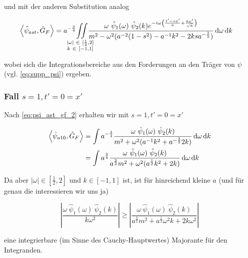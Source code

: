 
und mit der anderen Substitution analog

\begin{align}
    \left< \hat\psi_{ast}, \hat G_F \right>
    &=
    a^{-\frac{3}{4}}
    \kern -1em
    \iint \limits_{\substack{
        |\omega|~ \in~ [\frac{1}{2},2] \\
        k ~\in~ [-1,1]
        }
    }
    \kern -1em
    \frac{
        \omega ~\hat \psi_1(\omega) ~\hat \psi_2(k)
        e^{-i \omega \left(\frac{t' - sx'}{a} + \frac{kx'}{\sqrt{a}}\right)}
    }
    {
        m^2 - \omega^2(a^{-2}(1-s^2)-a^{-1}k^2 - 2 k s a^{-\frac{3}{2}})
    }
    \d \omega \d k
    \label{eq:psi_ast_gf_2}
\end{align}

wobei sich die Integrationsbereiche aus den Forderungen an den Träger von $\psi$
(vgl. \eqref{eq:supp_psi}) ergeben.


\subsubsection*{Fall $s=1, t' = 0 = x'$}
Nach \eqref{eq:psi_ast_gf_2} erhalten wir mit $s=1, t' = 0 = x'$

\begin{align*}
    \left< \hat\psi_{a10}, \hat G_F \right>
    &=
    \int a^{-\frac{3}{4}} \frac{
        \omega ~\hat \psi_1(\omega) ~\hat \psi_2(k)
    }
    {
        m^2+\omega^2 (a^{-1}k^2 + a^{-\frac{3}{2}}2 k )
    }
    \mathop{}\!\mathrm{d} \omega \mathop{}\!\mathrm{d} k \\
    &=
    \int a^{\frac{3}{4}} \frac{
        \omega ~\hat \psi_1(\omega) ~\hat \psi_2(k)
    }
    {
        a^{\frac{3}{2}} m^2+\omega^2 (a^{\frac{1}{2}}k^2 + 2 k )
    }
    \mathop{}\!\mathrm{d} \omega \mathop{}\!\mathrm{d} k
\end{align*}

Da aber $|\omega| \in [\frac{1}{2},2]$ und $k \in [-1,1]$ ist, ist für hinreichend
kleine $a$ (und für genau die interessieren wir uns ja)

\begin{equation*}
    \left|
        \frac{\omega ~\hat \psi_1(\omega) ~\hat \psi_2(k)}{k \omega^2}
    \right|
    \geq
    \left|
        \frac{\omega ~\hat \psi_1(\omega) ~\hat \psi_2(k)}
        {a^{\frac{3}{2}}m^2+a^{\frac{1}{2}}\omega^2 k+2k \omega^2}
    \right|
\end{equation*}

eine integrierbare (im Sinne des Cauchy-Hauptwertes) Majorante für den Integranden.

